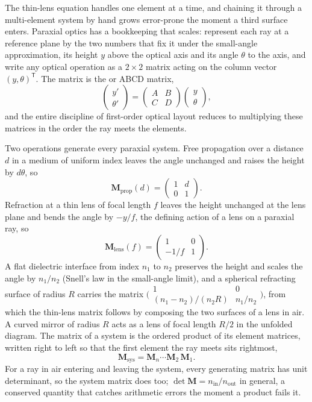 The thin-lens equation handles one element at a time, and chaining it through a
multi-element system by hand grows error-prone the moment a third surface
enters. Paraxial optics has a bookkeeping that scales: represent each ray at a
reference plane by the two numbers that fix it under the small-angle
approximation, its height $y$ above the optical axis and its angle $\theta$ to
the axis, and write any optical operation as a $2\times 2$ matrix acting on the
column vector $(y, \theta)^{\mathsf{T}}$. The matrix is the  or ABCD matrix,
\[
\begin{pmatrix} y' \\ \theta' \end{pmatrix}
= \begin{pmatrix} A & B \\ C & D \end{pmatrix}
  \begin{pmatrix} y \\ \theta \end{pmatrix},
\]
and the entire discipline of first-order optical layout reduces to multiplying
these matrices in the order the ray meets the elements.

Two operations generate every paraxial system. Free propagation over a distance
$d$ in a medium of uniform index leaves the angle unchanged and raises the
height by $d\theta$, so
\[
\mathbf{M}_{\text{prop}}(d) = \begin{pmatrix} 1 & d \\ 0 & 1 \end{pmatrix}.
\]
Refraction at a thin lens of focal length $f$ leaves the height unchanged at the
lens plane and bends the angle by $-y/f$, the defining action of a lens on a
paraxial ray, so
\[
\mathbf{M}_{\text{lens}}(f) = \begin{pmatrix} 1 & 0 \\ -1/f & 1 \end{pmatrix}.
\]
A flat dielectric interface from index $n_1$ to $n_2$ preserves the height and
scales the angle by $n_1/n_2$ (Snell's law in the small-angle limit), and a
spherical refracting surface of radius $R$ carries the matrix
$\big(\begin{smallmatrix} 1 & 0 \\ (n_1-n_2)/(n_2 R) & n_1/n_2
\end{smallmatrix}\big)$, from which the thin-lens matrix follows by composing
the two surfaces of a lens in air. A curved mirror of radius $R$ acts as a lens
of focal length $R/2$ in the unfolded diagram. The matrix of a system is the
ordered product of its element matrices, written right to left so that the first
element the ray meets sits rightmost,
\[
\mathbf{M}_{\text{sys}} = \mathbf{M}_n \cdots \mathbf{M}_2\,\mathbf{M}_1 .
\]
For a ray in air entering and leaving the system, every generating matrix has
unit determinant, so the system matrix does too; $\det\mathbf{M} = n_{\text{in}}
/n_{\text{out}}$ in general, a conserved quantity that catches arithmetic errors
the moment a product fails it.

